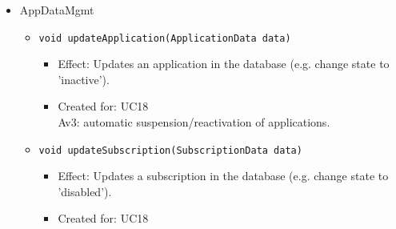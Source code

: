 \begin{itemize}
            \item AppDataMgmt
            \begin{itemize}
                \item \texttt{void updateApplication(ApplicationData data)}
                \begin{itemize}
                    \item Effect: Updates an application in the database (e.g. change state to 'inactive').
                    \item Created for: UC18 \\
                          Av3: automatic suspension/reactivation of applications.
                \end{itemize}
                \item \texttt{void updateSubscription(SubscriptionData data)}
                \begin{itemize}
                    \item Effect: Updates a subscription in the database (e.g. change state to 'disabled').
                    \item Created for: UC18
                \end{itemize}
            \end{itemize}
        \end{itemize}

